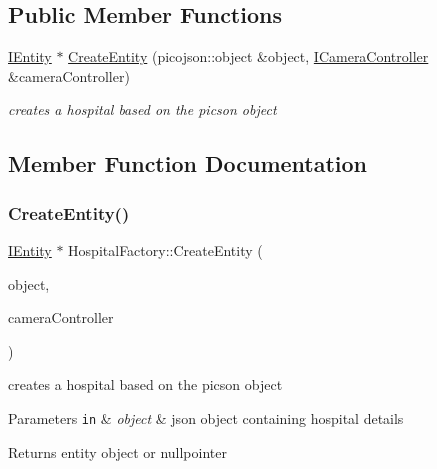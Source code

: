 \subsection*{Public Member Functions}
\begin{DoxyCompactItemize}
\item 
\hyperlink{classIEntity}{I\+Entity} $\ast$ \hyperlink{classHospitalFactory_a03bde29949e311469a3153da4e833622}{Create\+Entity} (picojson\+::object \&object, \hyperlink{classICameraController}{I\+Camera\+Controller} \&camera\+Controller)
\begin{DoxyCompactList}\small\item\em creates a hospital based on the picson object \end{DoxyCompactList}\end{DoxyCompactItemize}


\subsection{Member Function Documentation}
\mbox{\label{classHospitalFactory_a03bde29949e311469a3153da4e833622}} 
\subsubsection{\texorpdfstring{Create\+Entity()}{CreateEntity()}}
{\footnotesize\ttfamily \hyperlink{classIEntity}{I\+Entity} $\ast$ Hospital\+Factory\+::\+Create\+Entity (\begin{DoxyParamCaption}\item[{picojson\+::object \&}]{object,  }\item[{\hyperlink{classICameraController}{I\+Camera\+Controller} \&}]{camera\+Controller }\end{DoxyParamCaption})\hspace{0.3cm}{\ttfamily [virtual]}}



creates a hospital based on the picson object 


\begin{DoxyParams}[1]{Parameters}
\mbox{\tt in}  & {\em object} & json object containing hospital details\\
\hline
\end{DoxyParams}
\begin{DoxyReturn}{Returns}
entity object or nullpointer 
\end{DoxyReturn}


